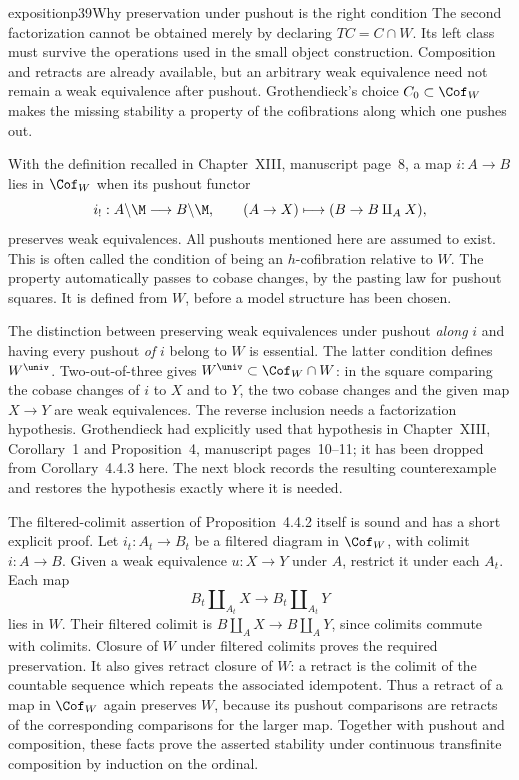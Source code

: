 \begin{dcomment}{exposition}{p39}{Why preservation under pushout is the right condition}
The second factorization cannot be obtained merely by declaring $TC=C\cap W$. Its left class must survive the operations used in the small object construction. Composition and retracts are already available, but an arbitrary weak equivalence need not remain a weak equivalence after pushout. Grothendieck's choice $C_0\subset\Cof_W$ makes the missing stability a property of the cofibrations along which one pushes out.

With the definition recalled in Chapter~XIII, manuscript page~8, a map $i:A\to B$ lies in $\Cof_W$ when its pushout functor
\[
i_!:A\backslash\M\longrightarrow B\backslash\M,
\qquad (A\to X)\longmapsto(B\to B\amalg_A X),
\]
preserves weak equivalences. All pushouts mentioned here are assumed to exist. This is often called the condition of being an $h$-cofibration relative to $W$. The property automatically passes to cobase changes, by the pasting law for pushout squares. It is defined from $W$, before a model structure has been chosen.

The distinction between preserving weak equivalences under pushout \emph{along} $i$ and having every pushout \emph{of} $i$ belong to $W$ is essential. The latter condition defines $W^{\univ}$. Two-out-of-three gives $W^{\univ}\subset\Cof_W\cap W$: in the square comparing the cobase changes of $i$ to $X$ and to $Y$, the two cobase changes and the given map $X\to Y$ are weak equivalences. The reverse inclusion needs a factorization hypothesis. Grothendieck had explicitly used that hypothesis in Chapter~XIII, Corollary~1 and Proposition~4, manuscript pages~10--11; it has been dropped from Corollary~4.4.3 here. The next block records the resulting counterexample and restores the hypothesis exactly where it is needed.

The filtered-colimit assertion of Proposition~4.4.2 itself is sound and has a short explicit proof. Let $i_t:A_t\to B_t$ be a filtered diagram in $\Cof_W$, with colimit $i:A\to B$. Given a weak equivalence $u:X\to Y$ under $A$, restrict it under each $A_t$. Each map
\[
B_t\amalg_{A_t}X\longrightarrow B_t\amalg_{A_t}Y
\]
lies in $W$. Their filtered colimit is $B\amalg_A X\to B\amalg_A Y$, since colimits commute with colimits. Closure of $W$ under filtered colimits proves the required preservation. It also gives retract closure of $W$: a retract is the colimit of the countable sequence which repeats the associated idempotent. Thus a retract of a map in $\Cof_W$ again preserves $W$, because its pushout comparisons are retracts of the corresponding comparisons for the larger map. Together with pushout and composition, these facts prove the asserted stability under continuous transfinite composition by induction on the ordinal.
\end{dcomment}

